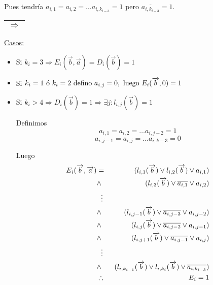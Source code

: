\documentclass[12pt,a4paper]{report}
\begin{document}
\begin{itemize}
							\par Pues tendría $a_{i, 1} = a_{i, 2} = \dotsc a_{i, k_{i-3}} = 1$ pero $\overline{a_{i, k_{i-3}}} = 1$.
					\end{itemize}

			\vspace{5mm}
			\begin{tabular}{|c|} \hline $\Rightarrow$ \\\hline \end{tabular}

					\vspace{3mm}
					\underline{Casos:}
					\begin{itemize}
						\item Si $k_{i} = 3 \Rightarrow E_{i}(\overrightarrow{b}, \overrightarrow{a}) = D_{i}(\overrightarrow{b}) = 1$
						\item Si $k_{i} = 1 \textup{ ó } k_{i} = 2 \textup{ defino } a_{i, j} = 0, \textup{ luego } E_{i}(\overrightarrow{b}, 0) = 1$
						\item Si $k_{i} > 4 \Rightarrow D_{i}(\overrightarrow{b}) = 1 \Rightarrow \exists j : l_{i, j}(\overrightarrow{b}) = 1$

							\par Definimos
								\[ a_{i, 1} = a_{i, 2} = \dotsc a_{i, j-2} = 1 \]
								\[ a_{i, j-1} = a_{i, j} = \dotsc a_{i, k-3} = 0 \]

							\par Luego
							\begin{eqnarray}
								\nonumber E_{i}(\overrightarrow{b}, \overrightarrow{a}) &=& (l_{i, 1}(\overrightarrow{b}) \vee l_{i, 2}(\overrightarrow{b}) \vee a_{i, 1}) \\
								\nonumber &\wedge & (l_{i, 3}(\overrightarrow{b}) \vee \overline{a_{i, 1}} \vee a_{i, 2}) \\
								\nonumber &\vdotswithin{\ldots}& \\
								\nonumber &\wedge & (l_{i, j-1}(\overrightarrow{b}) \vee \overline{a_{i, j-3}} \vee a_{i, j-2}) \\
								\nonumber &\wedge & (l_{i, j}(\overrightarrow{b}) \vee \overline{a_{i, j-2}} \vee a_{i, j-1}) \\
								\nonumber &\wedge & (l_{i, j+1}(\overrightarrow{b}) \vee \overline{a_{i, j-1}} \vee a_{i, j}) \\
								\nonumber &\vdotswithin{\ldots}& \\
								\nonumber &\wedge & (l_{i, k_{i-1}}(\overrightarrow{b}) \vee l_{i, k_{i}}(\overrightarrow{b}) \vee \overline{a_{i, k_{i-3}}}) \\
								\nonumber &\therefore & E_{i} = 1
							\end{eqnarray}
					\end{itemize}
\end{document}

